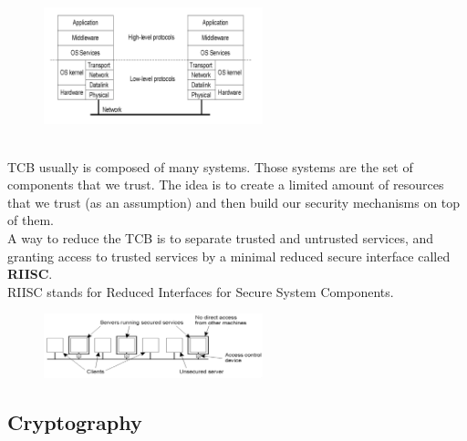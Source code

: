 \documentclass[10pt,a4paper]{article}
\begin{document}
\begin{figure}[h!]\hfill \includegraphics[width=180pt]{images/security-layers.png}\hspace*{\fill}
  \label{fig:security-layers}
\end{figure}  \\
TCB usually is composed of many systems. Those systems are the set of components that we trust. The idea is to create a limited amount of resources that we trust (as an assumption) and then build our security mechanisms on top of them. \\ A way to reduce the TCB is to separate trusted and untrusted services, and granting access to trusted services by a minimal reduced secure interface called \textbf{RIISC}. \\
RIISC stands for Reduced Interfaces for Secure System Components.
\begin{figure}[h!]\hfill \includegraphics[width=180pt]{images/riisc.png}\hspace*{\fill}
  \label{fig:riisc}
\end{figure}  \pagebreak
\subsection{Cryptography}
\end{document}
